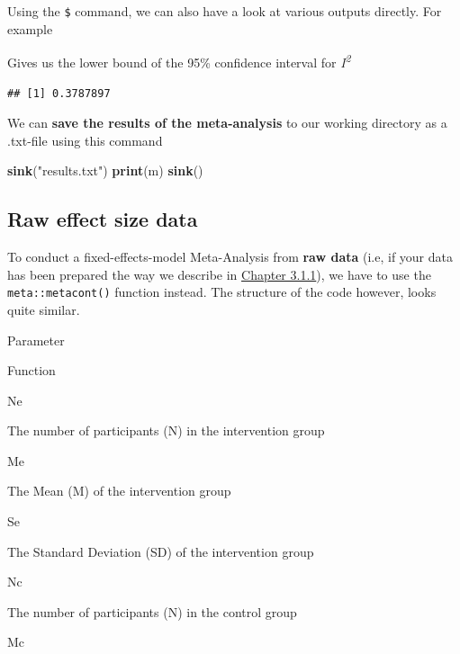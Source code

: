 \documentclass[]{book}
\newenvironment{Shaded}{\begin{snugshade}}{\end{snugshade}}
\newcommand{\KeywordTok}[1]{\textcolor[rgb]{0.13,0.29,0.53}{\textbf{#1}}}
\newcommand{\NormalTok}[1]{#1}
\newcommand{\OperatorTok}[1]{\textcolor[rgb]{0.81,0.36,0.00}{\textbf{#1}}}
\newcommand{\StringTok}[1]{\textcolor[rgb]{0.31,0.60,0.02}{#1}}
\begin{document}
Using the \texttt{\$} command, we can also have a look at various outputs directly. For example

\begin{Shaded}
\end{Shaded}

Gives us the lower bound of the 95\% confidence interval for \emph{I\textsuperscript{2}}

\begin{verbatim}
## [1] 0.3787897
\end{verbatim}

We can \textbf{save the results of the meta-analysis} to our working directory as a .txt-file using this command

\begin{Shaded}
\begin{Highlighting}[]
\KeywordTok{sink}\NormalTok{(}\StringTok{"results.txt"}\NormalTok{)}
\KeywordTok{print}\NormalTok{(m)}
\KeywordTok{sink}\NormalTok{()}
\end{Highlighting}
\end{Shaded}

\hypertarget{fixed.raw}{%
\subsection{Raw effect size data}\label{fixed.raw}}

To conduct a fixed-effects-model Meta-Analysis from \textbf{raw data} (i.e, if your data has been prepared the way we describe in \protect\hyperlink{excel_preparation}{Chapter 3.1.1}), we have to use the \texttt{meta::metacont()} function instead. The structure of the code however, looks quite similar.

Parameter

Function

Ne

The number of participants (N) in the intervention group

Me

The Mean (M) of the intervention group

Se

The Standard Deviation (SD) of the intervention group

Nc

The number of participants (N) in the control group

Mc
\end{document}
